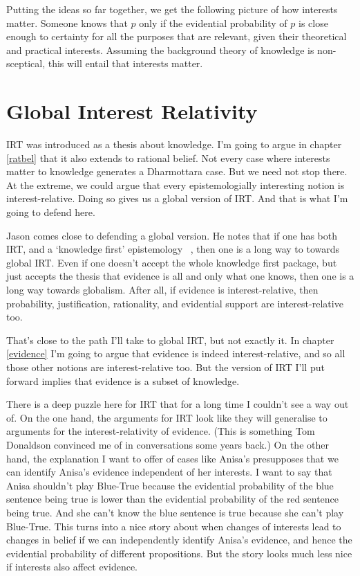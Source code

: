 \documentclass[11pt,]{book}
\begin{document}
Putting the ideas so far together, we get the following picture of how interests matter. Someone knows that \(p\) only if the evidential probability of \(p\) is close enough to certainty for all the purposes that are relevant, given their theoretical and practical interests. Assuming the background theory of knowledge is non-sceptical, this will entail that interests matter.

\hypertarget{global}{%
\section{Global Interest Relativity}\label{global}}

IRT was introduced as a thesis about knowledge. I'm going to argue in chapter \ref{ratbel} that it also extends to rational belief. Not every case where interests matter to knowledge generates a Dharmottara case. But we need not stop there. At the extreme, we could argue that every epistemologially interesting notion is interest-relative. Doing so gives us a global version of IRT. And that is what I'm going to defend here.

Jason \citet{Stanley2005} comes close to defending a global version. He notes that if one has both IRT, and a `knowledge first' epistemology ~\citep{Williamson2000}, then one is a long way to towards global IRT. Even if one doesn't accept the whole knowledge first package, but just accepts the thesis that evidence is all and only what one knows, then one is a long way towards globalism. After all, if evidence is interest-relative, then probability, justification, rationality, and evidential support are interest-relative too.

That's close to the path I'll take to global IRT, but not exactly it. In chapter \ref{evidence} I'm going to argue that evidence is indeed interest-relative, and so all those other notions are interest-relative too. But the version of IRT I'll put forward implies that evidence is a subset of knowledge.

There is a deep puzzle here for IRT that for a long time I couldn't see a way out of. On the one hand, the arguments for IRT look like they will generalise to arguments for the interest-relativity of evidence. (This is something Tom Donaldson convinced me of in conversations some years back.) On the other hand, the explanation I want to offer of cases like Anisa's presupposes that we can identify Anisa's evidence independent of her interests. I want to say that Anisa shouldn't play Blue-True because the evidential probability of the blue sentence being true is lower than the evidential probability of the red sentence being true. And she can't know the blue sentence is true because she can't play Blue-True. This turns into a nice story about when changes of interests lead to changes in belief if we can independently identify Anisa's evidence, and hence the evidential probability of different propositions. But the story looks much less nice if interests also affect evidence.
\end{document}
